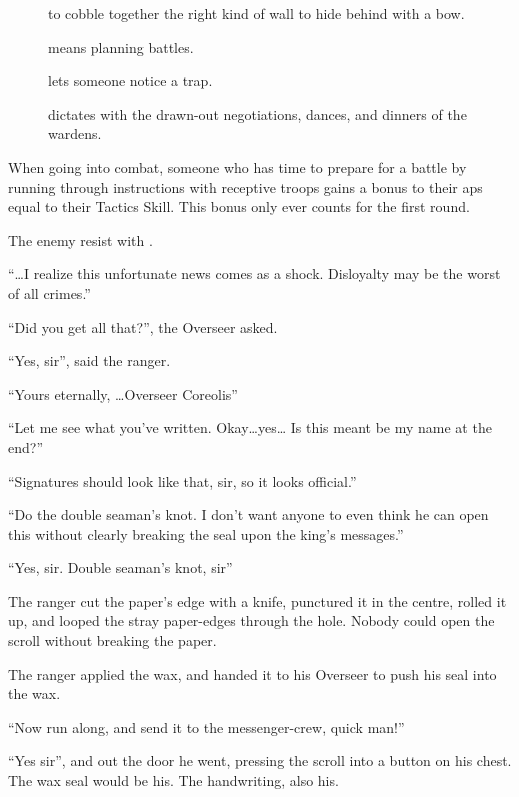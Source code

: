 \begin{multicols}{2}
\begin{description}
  \item[]
    to cobble together the right kind of wall to hide behind with a bow.
  \item[]
    means planning battles.
  \item[]
    lets someone notice a trap.
  \item[]
    dictates with the drawn-out negotiations, dances, and dinners of the wardens.
\end{description}

When going into combat, someone who has time to prepare for a battle by running through instructions with receptive troops gains a bonus to their \glspl{ap} equal to their Tactics Skill.
This bonus only ever counts for the first \gls{round}.

The enemy resist with .

\begin{exampletext}

  ``\ldots I realize this unfortunate news comes as a shock.
  Disloyalty may be the worst of all crimes.''

  ``Did you get all that?'', the Overseer asked.

  ``Yes, sir'', said the ranger.

  ``Yours eternally, \ldots Overseer Coreolis''

  ``Let me see what you've written.
  Okay\ldots yes\ldots
  Is this meant be my name at the end?''

  ``Signatures should look like that, sir, so it looks official.''

  ``Do the double seaman's knot.
  I don't want anyone to even think he can open this without clearly breaking the seal upon the king's messages.''

  ``Yes, sir.
  Double seaman's knot, sir''

  The ranger cut the paper's edge with a knife, punctured it in the centre, rolled it up, and looped the stray paper-edges through the hole.
  Nobody could open the scroll without breaking the paper.

  The ranger applied the wax, and handed it to his Overseer to push his seal into the wax.

  ``Now run along, and send it to the messenger-crew, quick man!''

  ``Yes sir'', and out the door he went, pressing the scroll into a button on his chest.
  The wax seal would be his.
  The handwriting, also his.


\end{exampletext}
\end{multicols}
